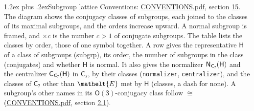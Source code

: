 \documentclass[10pt,a4paper]{article}
\makeatletter
\renewcommand\section{\@startsection{section}{1}{\z@}{-3ex plus -1ex minus -.2ex}%
  {1.2ex plus .2ex}{\normalfont\large\sffamily\bfseries\color{parttitle}}}
\numberwithin{equation}{section}
\newcommand{\eltfont}[1]{{\let\sigma\eltsigma\mathelt{#1}}}
\newcommand{\grp}[1]{\mathsf{#1}}
\newcommand{\cls}[1]{\eltfont{#1}}
\newcommand{\samecls}{\cong}
\newcommand{\hairsp}{\mkern1mu}
\makeatother
\begin{document}
\section{Subgroup lattice}\label{s:subgroups}
Conventions: \href{../../CONVENTIONS.pdf}{CONVENTIONS.pdf}, section \href{../../CONVENTIONS.pdf\#conv.15}{15}.
The diagram shows the conjugacy classes of subgroups, each joined to the classes of its maximal subgroups, and the orders increase upward. \label{n:index.conjugates.c}A normal subgroup is framed, and ${\times}c$ is the number $c > 1$ of conjugate subgroups. The table lists the classes by order, those of one symbol together. \label{n:group.H}\label{n:head.subgroup}\label{n:head.order}\label{n:head.conjugates}\label{n:head.normal}A row gives the representative $\grp{H}$ of a class of subgroups (subgrp), its order, the number of subgroups in the class (conjugates) and whether $\grp{H}$ is normal. \label{n:group.normalizer}\label{n:group.centralizer}\label{n:head.classes}It also gives the normalizer $\grp{N}_{\hairsp \grp{C_{7}}}(\grp{H})$ and the centralizer $\grp{C}_{\hairsp \grp{C_{7}}}(\grp{H})$ in $\grp{C_{7}}$, by their classes (\texttt{normalizer}, \texttt{centralizer}), and the classes of $\grp{C_{7}}$ other than $\cls{E}$ met by $\grp{H}$ (classes, a dash for none). A subgroup's other names in its \href{O3.pdf}{$\grp{O(3)}$}-conjugacy class follow $\samecls$ (\href{../../CONVENTIONS.pdf}{CONVENTIONS.pdf}, section \href{../../CONVENTIONS.pdf\#conv.2.1}{2.1}).
\begin{center}
\end{center}
\end{document}
